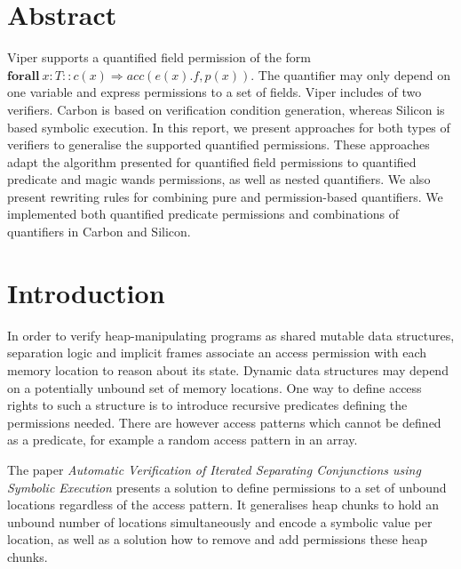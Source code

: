 \documentclass[12pt]{article}
\begin{document}
\clearpage
\newcommand*{\ident}{\hspace*{0.5cm}}
\newcommand{\wand}{\ensuremath{\mathbin{-\!\!*}}}

\maketitle
\newpage

\clearpage
{}
\tableofcontents
\newpage
\clearpage
{}%
\section{Abstract}
Viper supports a quantified field permission of the form \(\mathbf{forall\ } x:T :: c(x) \Rightarrow acc(e(x).f, p(x))\). The quantifier may only depend on one variable and express permissions to a set of fields. Viper includes of two verifiers. Carbon is based on verification condition generation, whereas Silicon is based symbolic execution. In this report, we present approaches for both types of verifiers to generalise the supported quantified permissions. These approaches adapt the algorithm presented for quantified field permissions to quantified predicate and magic wands permissions, as well as nested quantifiers. We also present rewriting rules for combining pure and permission-based quantifiers.
We implemented both quantified predicate permissions and combinations of quantifiers in Carbon and Silicon.

\section{Introduction}
In order to verify heap-manipulating programs as shared mutable data structures, separation logic\cite{reynolds2002separation} and implicit frames\cite{smans2009implicit} associate an access permission with each memory location to reason about its state. 
Dynamic data structures may depend on a potentially unbound set of memory locations. One way to define access rights to such a structure is to introduce recursive predicates defining the permissions needed. There are however access patterns which cannot be defined as a predicate, for example a random access pattern in an array.

The paper \textit{Automatic Verification of Iterated Separating Conjunctions using Symbolic Execution}\cite{isc} presents a solution to define permissions to a set of unbound locations regardless of the access pattern. It generalises heap chunks to hold an unbound number of locations simultaneously and encode a symbolic value per location, as well as a solution how to remove and add permissions these heap chunks.
\end{document}
